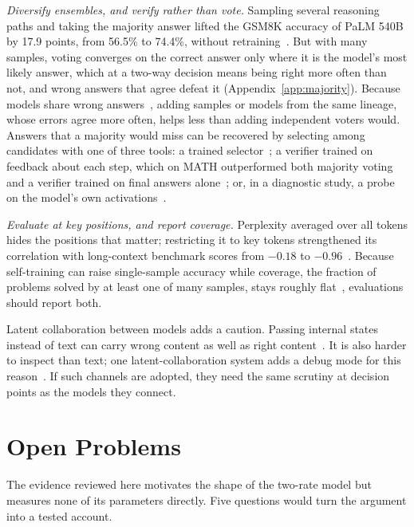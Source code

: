 \documentclass{ieeeaccess}
\begin{document}
\emph{Diversify ensembles, and verify rather than vote.} Sampling several reasoning paths and taking the majority answer lifted the GSM8K accuracy of PaLM 540B by 17.9 points, from 56.5\% to 74.4\%, without retraining~\cite{wang2023self}. But with many samples, voting converges on the correct answer only where it is the model's most likely answer, which at a two-way decision means being right more often than not, and wrong answers that agree defeat it (Appendix~\ref{app:majority}). Because models share wrong answers~\cite{kim2025correlated,goel2025think}, adding samples or models from the same lineage, whose errors agree more often, helps less than adding independent voters would. Answers that a majority would miss can be recovered by selecting among candidates with one of three tools: a trained selector~\cite{moshkov2025aimo}; a verifier trained on feedback about each step, which on MATH outperformed both majority voting and a verifier trained on final answers alone~\cite{lightman2024lets}; or, in a diagnostic study, a probe on the model's own activations~\cite{orgad2025know}.

\emph{Evaluate at key positions, and report coverage.} Perplexity averaged over all tokens hides the positions that matter; restricting it to key tokens strengthened its correlation with long-context benchmark scores from $-0.18$ to $-0.96$~\cite{fang2024what}. Because self-training can raise single-sample accuracy while coverage, the fraction of problems solved by at least one of many samples, stays roughly flat~\cite{costello2025think}, evaluations should report both.

Latent collaboration between models adds a caution. Passing internal states instead of text can carry wrong content as well as right content~\cite{cheng2026audit,fu2026c2c}. It is also harder to inspect than text; one latent-collaboration system adds a debug mode for this reason~\cite{zou2026latentmas}. If such channels are adopted, they need the same scrutiny at decision points as the models they connect.

\section{Open Problems}
\label{sec:open}
The evidence reviewed here motivates the shape of the two-rate model but measures none of its parameters directly. Five questions would turn the argument into a tested account.
\end{document}
